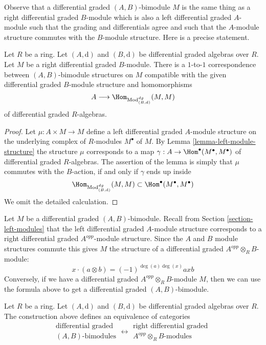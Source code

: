 \noindent
Observe that a differential graded $(A, B)$-bimodule
$M$ is the same thing as a right differential graded
$B$-module which is also a left differential graded
$A$-module such that the grading and differentials agree
and such that the $A$-module structure commutes with
the $B$-module structure. Here is a precise statement.

\begin{lemma}
\label{lemma-what-makes-a-bimodule-dg}
Let $R$ be a ring. Let $(A, \text{d})$ and $(B, \text{d})$ be
differential graded algebras over $R$. Let $M$ be a right differential
graded $B$-module. There is a $1$-to-$1$ correspondence
between $(A, B)$-bimodule structures on $M$ compatible with the given
differential graded $B$-module structure and homomorphisms
$$
A
\longrightarrow
\Hom_{\text{Mod}^{dg}_{(B, \text{d})}}(M, M)
$$
of differential graded $R$-algebras.
\end{lemma}

\begin{proof}
Let $\mu : A \times M \to M$ define a left differential graded $A$-module
structure on the underlying complex of $R$-modules $M^\bullet$ of $M$.
By Lemma \ref{lemma-left-module-structure} the structure $\mu$ corresponds
to a map $\gamma : A \to \Hom^\bullet(M^\bullet, M^\bullet)$
of differential graded $R$-algebras. The assertion of the lemma is simply
that $\mu$ commutes with the $B$-action, if and only if $\gamma$ ends
up inside
$$
\Hom_{\text{Mod}^{dg}_{(B, \text{d})}}(M, M) \subset
\Hom^\bullet(M^\bullet, M^\bullet)
$$
We omit the detailed calculation.
\end{proof}

\noindent
Let $M$ be a differential graded $(A, B)$-bimodule. Recall from
Section \ref{section-left-modules} that the left differential graded
$A$-module structure corresponds to a right differential graded
$A^{opp}$-module structure. Since the $A$ and $B$ module structures
commute this gives $M$ the structure of a differential graded
$A^{opp} \otimes_R B$-module:
$$
x \cdot (a \otimes b) = (-1)^{\deg(a)\deg(x)} axb
$$
Conversely, if we have a differential graded $A^{opp} \otimes_R B$-module
$M$, then we can use the formula above to get a differential graded
$(A, B)$-bimodule.

\begin{lemma}
\label{lemma-bimodule-over-tensor}
Let $R$ be a ring. Let $(A, \text{d})$ and $(B, \text{d})$
be differential graded algebras over $R$. The construction above
defines an equivalence of categories
$$
\begin{matrix}
\text{differential graded}\\
(A, B)\text{-bimodules}
\end{matrix}
\longleftrightarrow
\begin{matrix}
\text{right differential graded }\\
A^{opp} \otimes_R B\text{-modules}
\end{matrix}
$$
\end{lemma}

